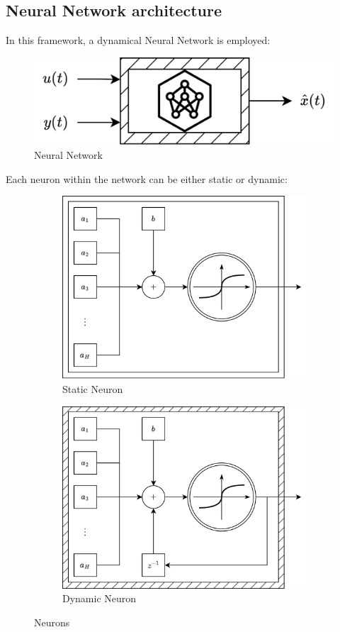 \subsection{Neural Network architecture}
In this framework, a dynamical Neural Network is employed:
\begin{figure}[H]
    \centering
    \includegraphics[width=0.4\linewidth]{images/nn.png}
    \caption{Neural Network}
\end{figure}
\noindent Each neuron within the network can be either static or dynamic:
\begin{figure}[H]
    \centering
    \begin{subfigure}{0.49\textwidth}
        \centering
        \includegraphics[width=0.75\linewidth]{images/snn.png} 
        \caption{Static Neuron}
    \end{subfigure}
    \begin{subfigure}{0.49\textwidth}
        \centering
        \includegraphics[width=0.75\linewidth]{images/dnn.png}
        \caption{Dynamic Neuron}
    \end{subfigure}
    \caption{Neurons}
\end{figure}

